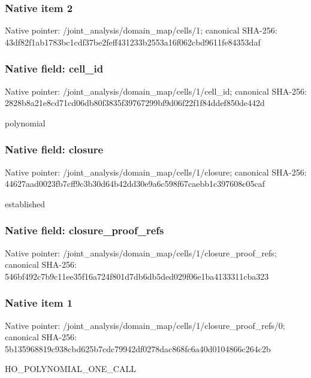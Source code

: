 \documentclass[10pt,a4paper]{article}
\begin{document}
\subsubsection{Native item 2}
Native pointer: /joint\_\allowbreak{}analysis/domain\_\allowbreak{}map/cells/1; canonical SHA-256: 43df82f1ab1783bc1cdf37be2feff431233b2553a16f062cbd9611fe84353daf

\subsubsection{Native field: cell\_\allowbreak{}id}
Native pointer: /joint\_\allowbreak{}analysis/domain\_\allowbreak{}map/cells/1/cell\_\allowbreak{}id; canonical SHA-256: 2828b8a21e8cd71cd06db80f3835f39767299bf9d06f22f1f84ddef850de442d

\begingroup\raggedright\sloppy polynomial\par\endgroup

\subsubsection{Native field: closure}
Native pointer: /joint\_\allowbreak{}analysis/domain\_\allowbreak{}map/cells/1/closure; canonical SHA-256: 44627aad0023fb7cff9c3b30d64b42dd30e9a6c598f67caebb1c397608c05caf

\begingroup\raggedright\sloppy established\par\endgroup

\subsubsection{Native field: closure\_\allowbreak{}proof\_\allowbreak{}refs}
Native pointer: /joint\_\allowbreak{}analysis/domain\_\allowbreak{}map/cells/1/closure\_\allowbreak{}proof\_\allowbreak{}refs; canonical SHA-256: 546bf492c7b9c11ee35f16a724f801d7db6db5ded029f06e1ba4133311cba323

\subsubsection{Native item 1}
Native pointer: /joint\_\allowbreak{}analysis/domain\_\allowbreak{}map/cells/1/closure\_\allowbreak{}proof\_\allowbreak{}refs/0; canonical SHA-256: 5b135968819c938cbd625b7cdc79942df0278dac868fc6a40d0104866c264c2b

\begingroup\raggedright\sloppy HO\_\allowbreak{}POLYNOMIAL\_\allowbreak{}ONE\_\allowbreak{}CALL\par\endgroup
\end{document}
